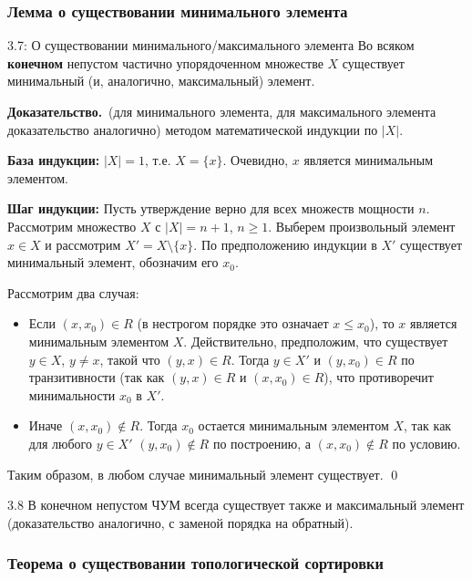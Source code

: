 \documentclass[a4paper,12pt]{article}
\newcommand{\myproof}{\textbf{Доказательство.}\ }
\begin{document}
	\subsubsection{Лемма о существовании минимального элемента}
	
	\begin{lemmabox}{3.7: О существовании минимального/максимального элемента}
		Во всяком \textbf{конечном} непустом частично упорядоченном множестве $X$ существует минимальный (и, аналогично, максимальный) элемент.
	\end{lemmabox}
	
	\myproof (для минимального элемента, для максимального элемента доказательство аналогично) методом математической индукции по $|X|$.
	
	\textbf{База индукции:} $|X| = 1$, т.е. $X = \{x\}$. Очевидно, $x$ является минимальным элементом.
	
	\textbf{Шаг индукции:} Пусть утверждение верно для всех множеств мощности $n$. Рассмотрим множество $X$ с $|X| = n+1$, $n \geq 1$. Выберем произвольный элемент $x \in X$ и рассмотрим $X' = X \setminus \{x\}$. По предположению индукции в $X'$ существует минимальный элемент, обозначим его $x_0$.
	
	Рассмотрим два случая:
	\begin{itemize}
		\item Если $(x, x_0) \in R$ (в нестрогом порядке это означает $x \le x_0$), то $x$ является минимальным элементом $X$. Действительно, предположим, что существует $y \in X$, $y \neq x$, такой что $(y, x) \in R$. Тогда $y \in X'$ и $(y, x_0) \in R$ по транзитивности (так как $(y, x) \in R$ и $(x, x_0) \in R$), что противоречит минимальности $x_0$ в $X'$.
		\item Иначе $(x, x_0) \notin R$. Тогда $x_0$ остается минимальным элементом $X$, так как для любого $y \in X'$ $(y, x_0) \notin R$ по построению, а $(x, x_0) \notin R$ по условию.
	\end{itemize}
	
	Таким образом, в любом случае минимальный элемент существует. \qed
	
	\begin{corollarybox}{3.8}
		В конечном непустом ЧУМ всегда существует также и максимальный элемент (доказательство аналогично, с заменой порядка на обратный).
	\end{corollarybox}

	
	\subsubsection{Теорема о существовании топологической сортировки}
	
\end{document}
